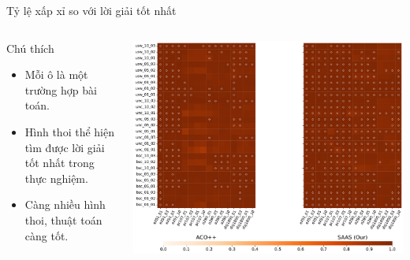\documentclass[aspectratio=169]{beamer}
\begin{document}
\begin{frame}{Tỷ lệ xấp xỉ so với lời giải tốt nhất}
\begin{columns}
    \begin{column}{0.3\textwidth}
        \centering
        \begin{block}{\footnotesize Chú thích}
            \footnotesize 
            \begin{itemize}
                \vspace{0.1cm}
                \item Mỗi ô là một trường hợp bài toán.
                \vspace{0.1cm}
                \item Hình thoi thể hiện tìm được lời giải tốt nhất trong thực nghiệm.
                \vspace{0.1cm}
                \item Càng nhiều hình thoi, thuật toán càng tốt.
                \vspace{0.1cm}
            \end{itemize}
        \end{block}
    \end{column}
    \begin{column}{0.6\textwidth}
        \centering
        \includegraphics[width=\linewidth]{img/profit_ratio_horizontal_2.pdf}
    \end{column}
\end{columns}
\end{frame}
\end{document}
